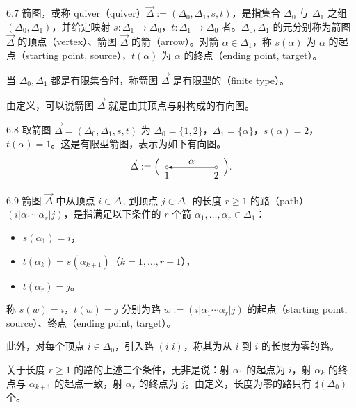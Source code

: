 \begin{definition}{6.7}
箭图，或称 quiver（quiver）$\vec{\Delta}:=(\Delta_0,\Delta_1,s,t)$，是指集合 $\Delta_0$ 与 $\Delta_1$ 之组 $(\Delta_0,\Delta_1)$，并给定映射 $s\colon\Delta_1\to\Delta_0$，$t\colon\Delta_1\to\Delta_0$ 者。$\Delta_0,\Delta_1$ 的元分别称为箭图 $\vec{\Delta}$ 的顶点（vertex）、箭图 $\vec{\Delta}$ 的箭（arrow）。对箭 $\alpha\in\Delta_1$，称 $s(\alpha)$ 为 $\alpha$ 的起点（starting point, source），$t(\alpha)$ 为 $\alpha$ 的终点（ending point, target）。
\end{definition}

当 $\Delta_0,\Delta_1$ 都是有限集合时，称箭图 $\vec{\Delta}$ 是有限型的（finite type）。

由定义，可以说箭图 $\vec{\Delta}$ 就是由其顶点与射构成的有向图。

\begin{example}{6.8}
取箭图 $\vec{\Delta}=(\Delta_0,\Delta_1,s,t)$ 为 $\Delta_0=\{1,2\}$，$\Delta_1=\{\alpha\}$，$s(\alpha)=2$，$t(\alpha)=1$。这是有限型箭图，表示为如下有向图。
\[
\vec{\Delta} := \Bigl(\,
\begin{tikzpicture}[baseline=-0.5ex]
  \node[draw,circle,inner sep=1pt,label=below:{$1$}] (v1) at (0,0) {};
  \node[draw,circle,inner sep=1pt,label=below:{$2$}] (v2) at (1.8,0) {};
  \draw[-{Stealth}] (v2) -- node[above]{$\alpha$} (v1);
\end{tikzpicture}
\,\Bigr).
\]
\end{example}

\begin{definition}{6.9}
箭图 $\vec{\Delta}$ 中从顶点 $i\in\Delta_0$ 到顶点 $j\in\Delta_0$ 的长度 $r\ge 1$ 的路（path）$(i|\alpha_1\cdots\alpha_r|j)$，是指满足以下条件的 $r$ 个箭 $\alpha_1,\dots,\alpha_r\in\Delta_1$：
\begin{itemize}[leftmargin=2em,itemsep=0pt,topsep=2pt]
\item $s(\alpha_1)=i$，
\item $t(\alpha_k)=s(\alpha_{k+1})$（$k=1,\dots,r-1$），
\item $t(\alpha_r)=j$。
\end{itemize}
称 $s(w)=i$，$t(w)=j$ 分别为路 $w:=(i|\alpha_1\cdots\alpha_r|j)$ 的起点（starting point, source）、终点（ending point, target）。
\end{definition}

此外，对每个顶点 $i\in\Delta_0$，引入路 $(i|i)$，称其为从 $i$ 到 $i$ 的长度为零的路。

关于长度 $r\ge 1$ 的路的上述三个条件，无非是说：射 $\alpha_1$ 的起点为 $i$，射 $\alpha_k$ 的终点与 $\alpha_{k+1}$ 的起点一致，射 $\alpha_r$ 的终点为 $j$。由定义，长度为零的路只有 $\sharp(\Delta_0)$ 个。

